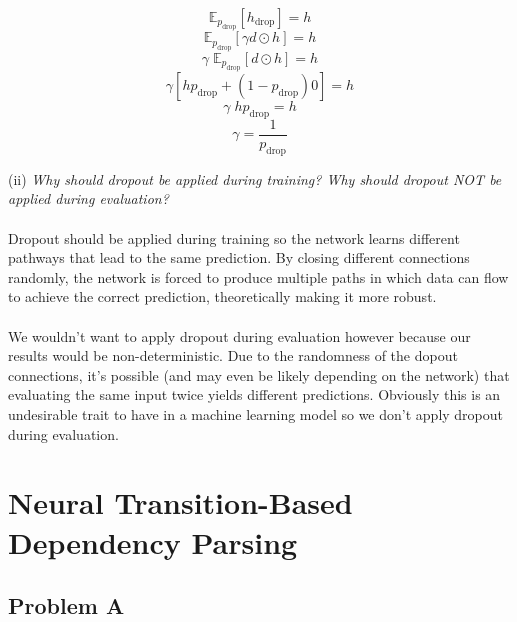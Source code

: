 \documentclass[12pt]{article}
\begin{document}
\begin{equation*}
    \mathbb{E}_{p_{\text{drop}}} [h_{\text{drop}}] = h
\end{equation*}
\begin{equation*}
    \mathbb{E}_{p_{\text{drop}}} [\gamma d \odot h ] = h
\end{equation*}
\begin{equation*}
    \gamma \; \mathbb{E}_{p_{\text{drop}}} [d \odot h] = h
\end{equation*}
\begin{equation*}
    \gamma [h p_{\text{drop}} + (1 - p_{\text{drop}})0] = h
\end{equation*}
\begin{equation*}
    \gamma \; h p_{\text{drop}} = h
\end{equation*}
\begin{equation*}
    \gamma = \frac{1}{p_{\text{drop}}}
\end{equation*}

(ii) \emph{Why should dropout be applied during training? Why should dropout 
NOT be applied during evaluation?}
~\\
~\\
Dropout should be applied during training so the network learns different
pathways that lead to the same prediction. By closing different connections 
randomly, the network is forced to produce multiple paths in which data can flow 
to achieve the correct prediction, theoretically making it more robust. 
~\\
~\\
We wouldn't want to apply dropout during evaluation however because our 
results would be non-deterministic. Due to the randomness of the 
dopout connections, it's possible (and may even be likely depending on the 
network) that evaluating the same input twice yields different predictions. 
Obviously this is an undesirable trait to have in a machine learning model 
so we don't apply dropout during evaluation. 


\section{Neural Transition-Based Dependency Parsing}

\subsection{Problem A}
\end{document}
